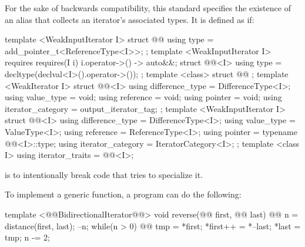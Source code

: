 \begin{addedblock}
\pnum
For the sake of backwards compatibility, this standard specifies the existence of an 
alias that collects an iterator's associated types. It is defined as if:

%
\begin{codeblock}
  template <WeakInputIterator I> struct @@ {
    using type = add_pointer_t<ReferenceType<I>>;
  };
  template <WeakInputIterator I>
    requires requires(I i) { { i.operator->() } -> auto&&; }
  struct @@<I> {
    using type = decltype(declval<I>().operator->());
  };
  template <class> struct @@ { };
  template <WeakIterator I> struct @@<I> {
    using difference_type = DifferenceType<I>;
    using value_type = void;
    using reference = void;
    using pointer = void;
    using iterator_category = output_iterator_tag;
  };
  template <WeakInputIterator I> struct @@<I> {
    using difference_type = DifferenceType<I>;
    using value_type = ValueType<I>;
    using reference = ReferenceType<I>;
    using pointer = typename @@<I>::type;
    using iterator_category = IteratorCategory<I>;
  };
  template <class I>
    using iterator_traits = @@<I>;
\end{codeblock}

\pnum
\enternote
{} is  to intentionally break code that tries to specialize
it.
\exitnote

\end{addedblock}

\pnum
\enterexample
To implement a generic
function, a \Cpp program can do the following:

\begin{codeblock}
template <@@BidirectionalIterator@@>
void reverse(@@ first, @@ last) {
  @@ n =
    distance(first, last);
  --n;
  while(n > 0) {
    @@
      tmp = *first;
    *first++ = *--last;
    *last = tmp;
    n -= 2;
  }
}
\end{codeblock}
\exitexample

